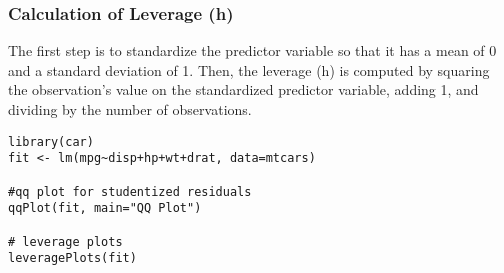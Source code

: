 \documentclass[residuals.tex]{subfiles}
\begin{document}
\subsubsection{Calculation of Leverage (h)}
The first step is to standardize the predictor variable so that it has a mean of 0 and a standard deviation of 1. 
Then, the leverage (h) is computed by squaring the observation's value on the standardized predictor variable, adding 1, 
and dividing by the number of observations.

\newpage

\begin{framed}
\begin{verbatim}
library(car)
fit <- lm(mpg~disp+hp+wt+drat, data=mtcars) 

#qq plot for studentized residuals
qqPlot(fit, main="QQ Plot")  

# leverage plots
leveragePlots(fit) 

\end{verbatim}
\end{framed}
\end{document}
